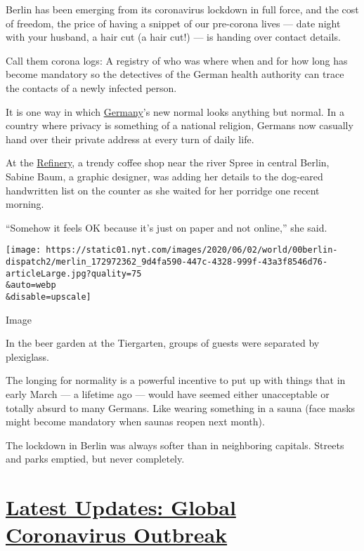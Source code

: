 Berlin has been emerging from its coronavirus lockdown in full force,
and the cost of freedom, the price of having a snippet of our pre-corona
lives --- date night with your husband, a hair cut (a hair cut!) --- is
handing over contact details.

Call them corona logs: A registry of who was where when and for how long
has become mandatory so the detectives of the German health authority
can trace the contacts of a newly infected person.

It is one way in which
\href{https://www.nytimes.com/2020/06/25/world/europe/germany-coronavirus-reopening.html}{Germany}'s
new normal looks anything but normal. In a country where privacy is
something of a national religion, Germans now casually hand over their
private address at every turn of daily life.

At the \href{http://refinerycoffee.de/en/}{Refinery}, a trendy coffee
shop near the river Spree in central Berlin, Sabine Baum, a graphic
designer, was adding her details to the dog-eared handwritten list on
the counter as she waited for her porridge one recent morning.

``Somehow it feels OK because it's just on paper and not online,'' she
said.

\texttt{[image: https://static01.nyt.com/images/2020/06/02/world/00berlin-dispatch2/merlin\_172972362\_9d4fa590-447c-4328-999f-43a3f8546d76-articleLarge.jpg?quality=75\\\&auto=webp\\\&disable=upscale]}

Image

In the beer garden at the Tiergarten, groups of guests were separated by
plexiglass.

The longing for normality is a powerful incentive to put up with things
that in early March --- a lifetime ago --- would have seemed either
unacceptable or totally absurd to many Germans. Like wearing something
in a sauna (face masks might become mandatory when saunas reopen next
month).

The lockdown in Berlin was always softer than in neighboring capitals.
Streets and parks emptied, but never completely.

\hypertarget{latest-updates-global-coronavirus-outbreak}{%
\section{\texorpdfstring{\href{https://www.nytimes.com/2020/08/01/world/coronavirus-covid-19.html?action=click\&pgtype=Article\&state=default\&region=MAIN_CONTENT_1\&context=storylines_live_updates}{Latest
Updates: Global Coronavirus
Outbreak}}{Latest Updates: Global Coronavirus Outbreak}}\label{latest-updates-global-coronavirus-outbreak}}

